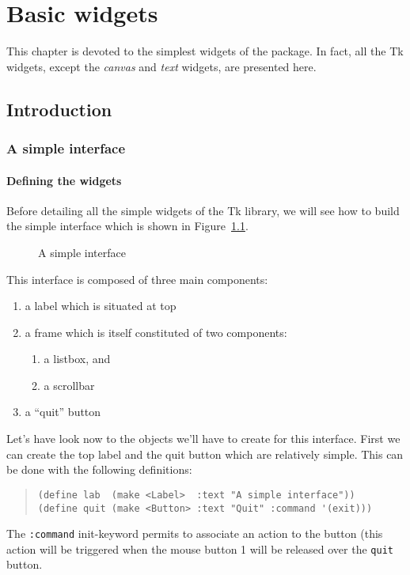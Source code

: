 %
%


\chapter{Basic widgets}

This chapter is devoted to the simplest widgets of the {\stklos} package.
In fact, all the Tk widgets, except the {\em canvas} and {\em text} widgets,
are presented here.

\section{Introduction}

\subsection{A simple interface}

\subsubsection{Defining the widgets}
Before detailing all the simple widgets of the Tk library, we will see how to
build the simple interface which is shown in Figure~\ref{fig-simple-interface}. 
\begin{figure}
\centerline{}
\caption{A simple interface}
\label{fig-simple-interface}
\end{figure}
This interface is composed of three main components: 
\begin{enumerate}
\item a label which is situated at top
\item a frame which is itself constituted of two components: 
\begin{enumerate}
\item a listbox, and
\item a scrollbar
\end{enumerate}
\item a ``quit'' button
\end{enumerate}
Let's have look now to  the objects we'll have to create for this interface.
First we can create the top label and the quit button which are relatively
simple. This can be done with the following definitions:
\begin{quote}
\begin{verbatim}
(define lab  (make <Label>  :text "A simple interface"))
(define quit (make <Button> :text "Quit" :command '(exit)))
\end{verbatim}
\end{quote}
The {\tt :command} init-keyword permits to associate an action to the button
(this action will be triggered when the mouse button 1 will be released over
the {\tt quit} button.


